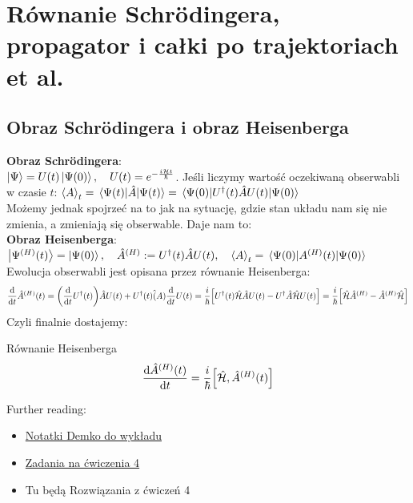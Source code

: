 \documentclass[12pt,a4paper]{report}
\newcommand{\subind}[2]{{\color{blue} #1\index{#2}}}
\newcommand{\link}[2]{{\color{cyan} \href{#1}{#2}}}
\newcommand{\HS}{\mathcal{H}}
\newcommand{\psket}[1]{\ket{\Psi(#1)}}
\renewcommand{\emph}{\textbf}
\newenvironment{lecture}[1]{\par\medskip
   \noindent\chapter{#1} \rmfamily}{\medskip}
\newenvironment{emph_box}[1]
    {\begin{center}\color{BrickRed}
    \begin{tabular}{|p{0.9\textwidth}|}
    \hline
    \begin{center} \color{Dandelion}{\textbf{#1}} \end{center}
    \begin{center}
    }
    {
    \end{center}
    \\\\\hline
    \end{tabular} 
    \end{center}
    \color{black}
    }
\begin{document}
\begin{lecture}{Równanie Schrödingera, propagator i całki po trajektoriach et al.}
\section{Obraz Schrödingera i obraz Heisenberga}
\label{sec:lec_5:schrodinger_heisenberg}
\emph{Obraz Schrödingera}:\\
$\ket{\Psi} = U(t) \psket{0}\qc U(t) = e^{- \frac{i \HS t}{\hbar}}$. Jeśli liczymy wartość oczekiwaną obserwabli w czasie $t$: $\ev{A}_t = \ev{\hat{A}}{\Psi(t)} = \ev{U^\dagger(t) \hat{A} U(t)}{\Psi(0)}$\\
Możemy jednak spojrzeć na to jak na sytuację, gdzie stan układu nam się nie zmienia, a zmieniają się obserwable. Daje nam to:\\
\emph{Obraz Heisenberga}:\\
$\ket{\Psi^{(H)}(t)} = \psket{0} \qc \hat{A}^{(H)} := U^\dagger (t) \hat{A} U(t)\qc \ev{A}_t = \ev{A^{(H)}(t)}{\Psi(0)}$\\
Ewolucja obserwabli jest opisana przez równanie Heisenberga:\\
\[
    \dv{t} \hat{A}^{(H)}(t) = \qty(\dv{t} U^\dagger (t)) \hat{A} U(t) + U^\dagger(t) \hat(A) \dv{t} U(t) = \frac{i}{\hbar} \qty[U^\dagger(t) \hat{\HS} \hat{A} U(t) - U^\dagger \hat{A} \hat{\HS} U(t)] = \frac{i}{\hbar} \qty[\hat{\HS}\hat{A}^{(H)} - \hat{A}^{(H)}\hat{\HS}]
\]
Czyli finalnie dostajemy:

\begin{emph_box}{\subind{Równanie Heisenberga}{Równanie!Heisenberga}}
    \begin{equation}
        \dv{\hat{A}^{(H)}(t)}{t} = \frac{i}{\hbar} \qty[\hat{\HS}, \hat{A}^{(H)}(t)]
        \label{eq:lec_5:heisenberg}
    \end{equation}
\end{emph_box}

Further reading:
\begin{itemize}
    \item \link{http://studenci.fuw.edu.pl/~kc427902/Prezentacje_Kwanty/wyklad4-schroedinger.pdf}{Notatki Demko do wykładu}
    \item \link{http://studenci.fuw.edu.pl/~kc427902/Prezentacje_Kwanty/cwiczenia4.pdf}{Zadania na ćwiczenia 4}
    \item Tu będą Rozwiązania z ćwiczeń 4
\end{itemize}


\end{lecture}
\end{document}
